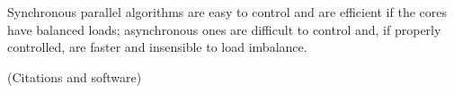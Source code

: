 Synchronous parallel algorithms are easy to control and are efficient if the cores have balanced loads; asynchronous  ones are difficult to control and, if properly controlled, are faster and insensible to load imbalance.

(Citations and software)

%
%
%
%
%
%
% 
%
%
%

